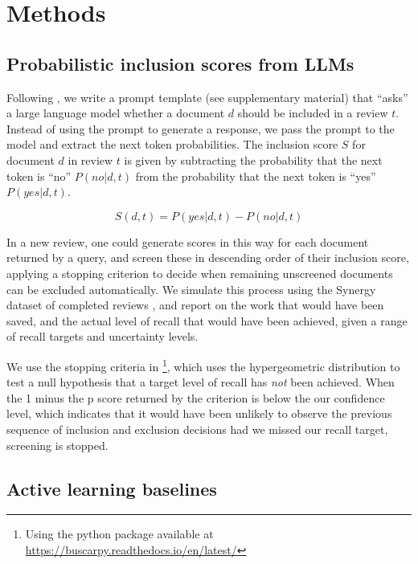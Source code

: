 \documentclass{article}
\begin{document}
	\section*{Methods}
	
	\subsection*{Probabilistic inclusion scores from LLMs}
	
	Following \cite{wang_zero-shot_2024}, we write a prompt template (see supplementary material) that ``asks'' a large language model whether a document $d$ should be included in a review $t$. Instead of using the prompt to generate a response, we pass the prompt to the model and extract the next token probabilities. The inclusion score $S$ for document $d$ in review $t$ is given by subtracting the probability that the next token is ``no'' $P(no|d,t)$ from the probability that the next token is ``yes'' $P(yes|d,t)$.
	
	\begin{equation}S(d,t) = P(yes|d,t) - P(no|d,t)\end{equation}
	
	In a new review, one could generate scores in this way for each document returned by a query, and screen these in descending order of their inclusion score, applying a stopping criterion to decide when remaining unscreened documents can be excluded automatically.  We simulate this process using the Synergy dataset of completed reviews \cite{de_bruin_synergy_2023}, and report on the work that would have been saved, and the actual level of recall that would have been achieved, given a range of recall targets and uncertainty levels.
	
	We use the stopping criteria in \cite{callaghan_statistical_2020}\footnote{Using the python package available at \url{https://buscarpy.readthedocs.io/en/latest/}}, which uses the hypergeometric distribution to test a null hypothesis that a target level of recall has \textit{not} been achieved. When the 1 minus the p score returned by the criterion is below the our confidence level, which indicates that it would have been unlikely to observe the previous sequence of inclusion and exclusion decisions had we missed our recall target, screening is stopped. 
	
	\subsection*{Active learning baselines}
	
\end{document}
